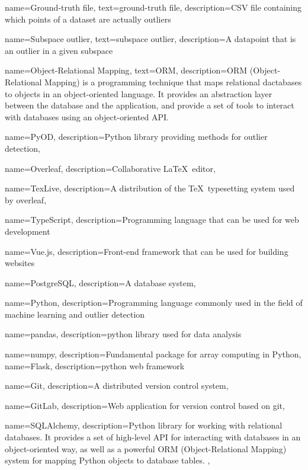 {
    name={Ground-truth file},
    text={ground-truth file},
    description={\gls*{CSV} file containing which points of a dataset are actually outliers}
}

{
    name={Subspace outlier},
    text={subspace outlier},
    description={A datapoint that is an outlier in a given \gls*{subspace}}
}

{
    name={Object-Relational Mapping},
    text={ORM},
    description={ORM (Object-Relational Mapping) is a programming technique that maps relational dactabases to objects in an object-oriented language. It provides an abstraction layer between the database and the application, and provide a set of tools to interact with databases using an object-oriented API.}
}


{
    name={PyOD},
    description={Python library providing methods for outlier detection},
}

{
    name={Overleaf},
    description={Collaborative \LaTeX\ editor},
}

{
    name={TexLive},
    description={A distribution of the \TeX\ typesetting system used by \gls*{overleaf}},
}

{
    name={TypeScript},
    description={Programming language that can be used for web development}
}

{
    name={Vue.js},
    description={Front-end framework that can be used for building websites}
}

{
    name={PostgreSQL},
    description={A database system},
}

{
    name={Python},
    description={Programming language commonly used in the field of machine learning and outlier detection}
}

{
    name={pandas},
    description={\Gls*{python} library used for data analysis}
}

{
    name={numpy},
    description={Fundamental package for array computing in Python},
}
{
    name={Flask},
    description={\Gls*{python} web framework}
}

{
    name={Git},
    description={A distributed version control system},
}

{
    name={GitLab},
    description={Web application for version control based on \gls*{git}},
}

{
    name={SQLAlchemy},
    description={Python library for working with relational databases. It provides a set of high-level API for interacting with databases in an object-oriented way, as well as a powerful \Gls{ORM} (Object-Relational Mapping) system for mapping Python objects to database tables. },
}
